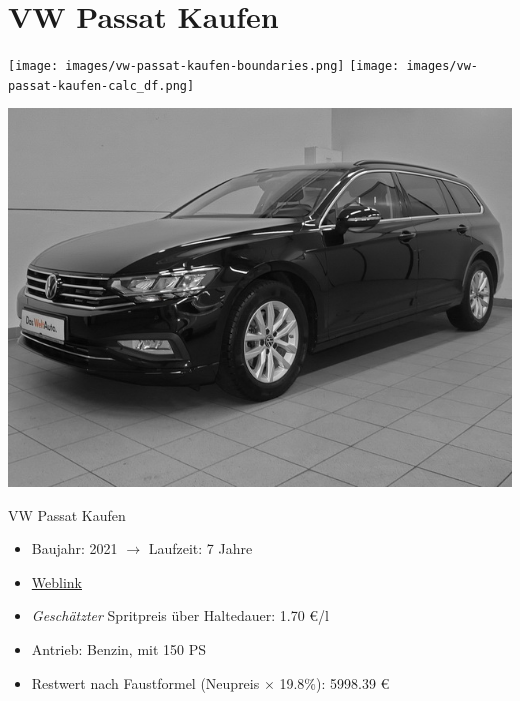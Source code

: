 \documentclass[landscape, DIV=99, 14pt]{scrartcl}
\begin{document}
\pagebreak


\twocolumn

\section*{VW Passat Kaufen}
\begin{center}
\texttt{[image: images/vw-passat-kaufen-boundaries.png]}
\null
\vspace{0.5cm}
\texttt{[image: images/vw-passat-kaufen-calc\_df.png]}
\end{center}

\pagebreak
\null
\vspace{2cm}
\begin{center}
\includegraphics[width=0.9\columnwidth]{cars/vw-passat.jpg}

VW Passat Kaufen
\end{center}

\begin{itemize}
    \item Baujahr: 2021 $\rightarrow$ Laufzeit: 7 Jahre
    \item \href{https://www.autosuche.de/auto/REVVNDQ3NjgwMjc5NzI=?t_manuf=BQ&t_petr=B&t_model=BQBM&t_gear=A&t_ez_fr=2020&t_pe_fr=35000&sort=PRICE_SALE&sortdirection=ASC&viewMode=tile}{Weblink}
    \item \emph{Gesch\"atzter} Spritpreis \"uber Haltedauer: 1.70 \euro{}/l
    \item Antrieb: Benzin, mit 150 PS
    \item Restwert nach Faustformel (Neupreis $\times$ 19.8\%): 5998.39 \euro{}
\end{itemize}

\pagebreak
\end{document}
